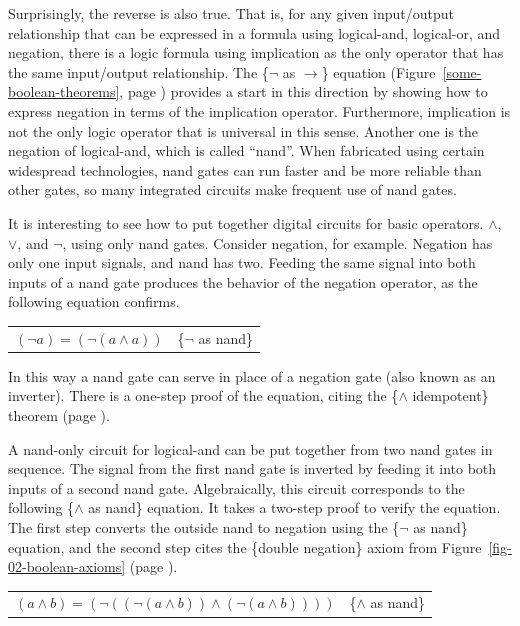 Surprisingly, the reverse is also true.
That is, for any given input/output relationship that can be expressed
in a formula using logical-and, logical-or, and negation,
there is a logic formula using implication as
the only operator that has the same input/output relationship.
The \{$\neg$ as $\rightarrow$\} equation
(Figure~\ref{some-boolean-theorems}, page \pageref{some-boolean-theorems})
provides a start in this direction by showing how to express
negation in terms of the implication operator.
Furthermore, implication is not the only logic operator
that is universal in this sense.
Another one
is the negation of logical-and, which is called ``nand''.
When fabricated using certain widespread technologies,
nand gates can run faster and be more reliable than other gates,
so many integrated circuits make frequent use of nand gates.

It is interesting to see how to put together digital
circuits for basic operators.
$\wedge$, $\vee$, and $\neg$, using only nand gates.
Consider negation, for example.
Negation has only one input signals, and nand has two.
Feeding the same signal into both
inputs of a nand gate produces the behavior of
the negation operator,
as the following equation confirms.

\begin{center}
\begin{tabular}{ll}
$(\neg a) = (\neg (a \wedge a))$  & \{$\neg$ as nand\}\label{neg-as-nand}
\end{tabular}
\end{center}

In this way a nand gate can serve in place of a
negation gate (also known as an inverter).
There is a one-step proof of the equation,
citing the \{$\wedge$ idempotent\} theorem
(page \pageref{and-idempotent}).

A nand-only circuit for logical-and can be
put
together from two nand gates in sequence.
The signal from the first nand gate is inverted
by feeding it into both inputs of a second nand gate.
Algebraically, this circuit corresponds to the following \{$\wedge$ as nand\} equation.
It takes a two-step proof to verify the equation.
The first step converts the outside nand to negation using the
\{$\neg$ as nand\} equation, and the second step cites
the \{double negation\} axiom from Figure~\ref{fig-02-boolean-axioms}
(page \pageref{fig-02-boolean-axioms}).

\begin{center}
\begin{tabular}{ll}
$(a \wedge b) = (\neg ((\neg (a \wedge b)) \wedge (\neg (a \wedge b))))$ & \{$\wedge$ as nand\}\label{and-as-nand}
\end{tabular}
\end{center}

